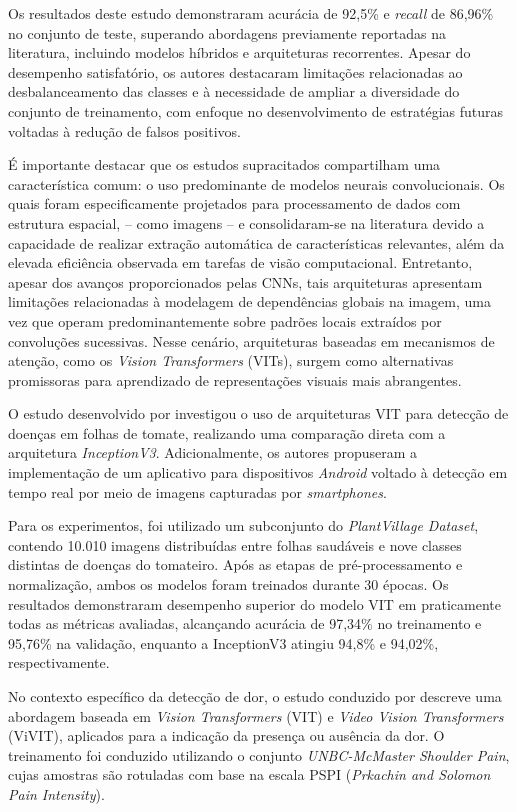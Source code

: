 Os resultados deste estudo demonstraram acurácia de 92,5\% e \textit{recall} de 86,96\% no conjunto de teste, superando abordagens previamente reportadas na literatura, incluindo modelos híbridos e arquiteturas recorrentes. Apesar do desempenho satisfatório, os autores destacaram limitações relacionadas ao desbalanceamento das classes e à necessidade de ampliar a diversidade do conjunto de treinamento, com enfoque no desenvolvimento de estratégias futuras voltadas à redução de falsos positivos.

É importante destacar que os estudos supracitados compartilham uma característica comum: o uso predominante de modelos neurais convolucionais. Os quais foram especificamente projetados para processamento de dados com estrutura espacial, -- como imagens -- e consolidaram-se na literatura devido a capacidade de realizar extração automática de características relevantes, além da elevada eficiência observada em tarefas de visão computacional. Entretanto, apesar dos avanços proporcionados pelas \acsp{CNN}, tais arquiteturas apresentam limitações relacionadas à modelagem de dependências globais na imagem, uma vez que operam predominantemente sobre padrões locais extraídos por convoluções sucessivas. Nesse cenário, arquiteturas baseadas em mecanismos de atenção, como os \textit{Vision Transformers} (\acsp{VIT}), surgem como alternativas promissoras para aprendizado de representações visuais mais abrangentes.

O estudo desenvolvido por \cite{barman2024} investigou o uso de arquiteturas \acs{VIT} para detecção de doenças em folhas de tomate, realizando uma comparação direta com a arquitetura \textit{InceptionV3}. Adicionalmente, os autores propuseram a implementação de um aplicativo para dispositivos \textit{Android} voltado à detecção em tempo real por meio de imagens capturadas por \textit{smartphones}.

Para os experimentos, foi utilizado um subconjunto do \textit{PlantVillage Dataset}, contendo 10.010 imagens distribuídas entre folhas saudáveis e nove classes distintas de doenças do tomateiro. Após as etapas de pré-processamento e normalização, ambos os modelos foram treinados durante 30 épocas. Os resultados demonstraram desempenho superior do modelo \acs{VIT} em praticamente todas as métricas avaliadas, alcançando acurácia de 97,34\% no treinamento e 95,76\% na validação, enquanto a InceptionV3 atingiu 94,8\% e 94,02\%, respectivamente.

No contexto específico da detecção de dor, o estudo conduzido por \cite{fiorentini2022} descreve uma abordagem baseada em \textit{Vision Transformers} (\acs{VIT}) e \textit{Video Vision Transformers} (\acs{ViVIT}), aplicados para a indicação da presença ou ausência da dor. O treinamento foi conduzido utilizando o conjunto \textit{UNBC-McMaster Shoulder Pain}, cujas amostras são rotuladas com base na escala \acs{PSPI} (\textit{Prkachin and Solomon Pain Intensity}).

